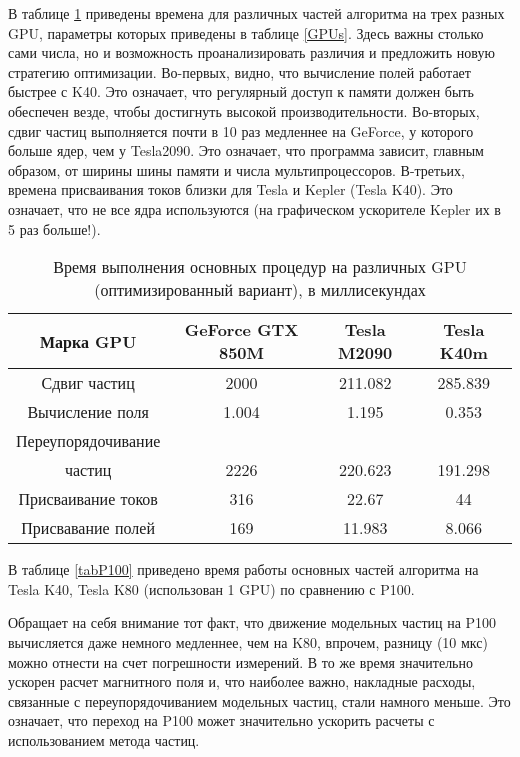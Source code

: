 В таблице \ref {PerfGPUs} приведены времена для различных частей алгоритма на трех разных GPU, параметры которых приведены в таблице \ref{GPUs}. Здесь важны столько сами числа, но и возможность проанализировать различия и предложить новую стратегию оптимизации. Во-первых, видно, что вычисление полей работает быстрее с K40. Это означает, что регулярный доступ к памяти должен быть обеспечен везде, чтобы достигнуть высокой производительности. Во-вторых, сдвиг частиц выполняется почти в 10 раз медленнее на  GeForce, у которого больше ядер, чем у Tesla2090. Это означает, что программа зависит, главным образом, от ширины шины памяти
и числа мультипроцессоров. В-третьих, времена присваивания токов  близки для Tesla и Kepler (Tesla K40). Это означает, что не все ядра используются (на графическом ускорителе Kepler их в 5 раз больше!).

\begin{table}[ht]
	\begin{center}
		\caption{Время выполнения основных процедур на различных GPU (оптимизированный вариант), в миллисекундах}
		\begin{tabular}{|c|c|c|c|}
			\hline
			Марка GPU        &  GeForce GTX 850M & Tesla M2090 & Tesla K40m \\ \hline
			Сдвиг частиц       &  2000           &  211.082    & 285.839 \\ \hline
			Вычисление поля    &  1.004          &  1.195      & 0.353   \\ \hline
			Переупорядочивание  &                 &             &         \\
			частиц            &  2226           &  220.623    & 191.298  \\ \hline
			Присваивание токов &  316            &  22.67      & 44 \\ \hline
			Присвавание полей   &  169            &  11.983     & 8.066 \\ \hline
		\end{tabular}
		\label{PerfGPUs}
	\end{center}
\end{table}



В таблице \ref{tabP100} приведено время работы основных частей алгоритма на Tesla K40, Tesla K80 (использован 1 GPU) по сравнению с P100.

Обращает на себя внимание тот факт, что движение модельных частиц на P100 вычисляется даже немного медленнее, чем на K80, впрочем, разницу (10 мкс) можно отнести на счет погрешности измерений. В то же время значительно ускорен расчет магнитного поля и, что наиболее важно, накладные расходы, связанные с переупорядочиванием модельных частиц, стали намного меньше. Это означает, что  переход на P100 может значительно ускорить расчеты с использованием метода частиц.

